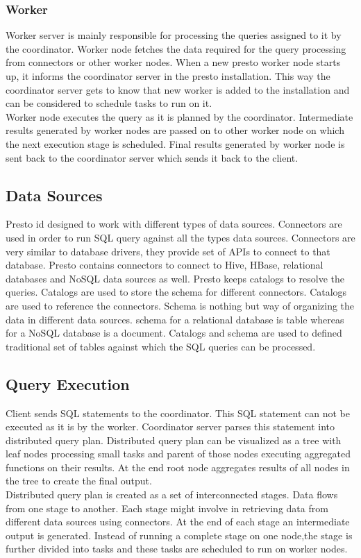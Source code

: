 \subsubsection{Worker}
Worker server is mainly responsible for processing the queries assigned to it
by the coordinator. Worker node fetches the data required for the query
processing from connectors or other worker nodes. When a new presto worker node
starts up, it informs the coordinator server in the presto installation. This
way the coordinator server gets to know that new worker is added to the
installation and can be considered to schedule tasks to run on it.\\
Worker node executes the query as it is planned by the coordinator. Intermediate
results generated by worker nodes are passed on to other worker node on which
the next execution stage is scheduled. Final results generated by worker node is
sent back to the coordinator server which sends it back to the client.

\subsection{Data Sources}
Presto id designed to work with different types of data sources. Connectors are
used in order to run SQL query against all the types data sources. Connectors
are very similar to database drivers, they provide set of APIs to connect to
that database. Presto contains connectors to connect to Hive, HBase, relational
databases and NoSQL data sources as well. Presto keeps catalogs to resolve the
queries. Catalogs are used to store the schema for different connectors.
Catalogs are used to reference the connectors. Schema is nothing but way of
organizing the data in different data sources. schema for a relational database
is table whereas for a NoSQL database is a document. Catalogs and schema are
used to defined traditional set of tables against which the SQL queries can be
processed.

\subsection{Query Execution}
Client sends SQL statements to the coordinator. This SQL statement can not be
executed as it is by the worker. Coordinator server parses this statement into
distributed query plan. Distributed query plan can be visualized as a tree with
leaf nodes processing small tasks and parent of those nodes executing aggregated
functions on their results. At the end root node aggregates results of all
nodes in the tree to create the final output.\\
Distributed query plan is created as a set of interconnected stages. Data flows
from one stage to another. Each stage might involve in retrieving data from
different data sources using connectors. At the end of each stage an
intermediate output is generated. Instead of running a complete stage on one
node,the stage is further divided into tasks and these tasks are scheduled to
run on worker nodes.

